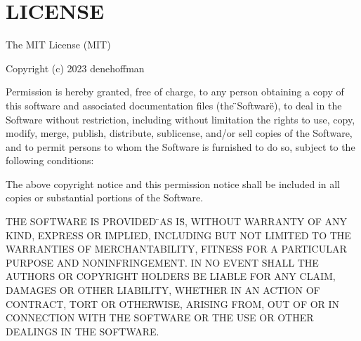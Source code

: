 \chapter{LICENSE}
\hypertarget{md_LICENSE}{}\label{md_LICENSE}
The MIT License (MIT)

Copyright (c) 2023 denehoffman

Permission is hereby granted, free of charge, to any person obtaining a copy of this software and associated documentation files (the \"{}\+Software\"{}), to deal in the Software without restriction, including without limitation the rights to use, copy, modify, merge, publish, distribute, sublicense, and/or sell copies of the Software, and to permit persons to whom the Software is furnished to do so, subject to the following conditions\+:

The above copyright notice and this permission notice shall be included in all copies or substantial portions of the Software.

THE SOFTWARE IS PROVIDED \"{}\+AS IS\"{}, WITHOUT WARRANTY OF ANY KIND, EXPRESS OR IMPLIED, INCLUDING BUT NOT LIMITED TO THE WARRANTIES OF MERCHANTABILITY, FITNESS FOR A PARTICULAR PURPOSE AND NONINFRINGEMENT. IN NO EVENT SHALL THE AUTHORS OR COPYRIGHT HOLDERS BE LIABLE FOR ANY CLAIM, DAMAGES OR OTHER LIABILITY, WHETHER IN AN ACTION OF CONTRACT, TORT OR OTHERWISE, ARISING FROM, OUT OF OR IN CONNECTION WITH THE SOFTWARE OR THE USE OR OTHER DEALINGS IN THE SOFTWARE. 